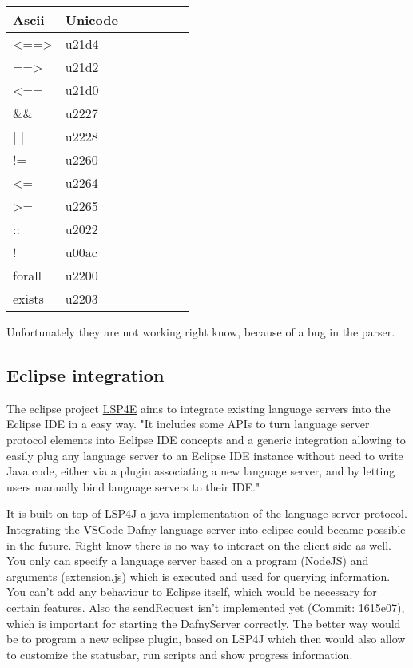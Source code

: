 \begin{longtable}[H]
	{l|p{}| p{} | p{} | p{} | p{} | p{}}
	
	\textbf{Ascii} & \textbf{Unicode}  \\ \hline
	<==> & u21d4  \\  
	==> & u21d2  \\  
	<== & u21d0  \\  
	\&\& & u2227  \\  
	| | & u2228  \\  
	!= & u2260  \\  
	<= & u2264  \\  
	>= & u2265  \\  
	:: & u2022  \\  
	! & u00ac  \\  
	forall & u2200  \\  
	exists & u2203  
	
	
\end{longtable}

Unfortunately they are not working right know, because of a bug in the parser.


\subsection{Eclipse integration}
The eclipse project \href{https://projects.eclipse.org/projects/technology.lsp4e}{LSP4E} aims to integrate existing language servers into the Eclipse IDE in a easy way. 
\newline
"It includes some APIs to turn language server protocol elements into Eclipse IDE concepts and a generic integration allowing to easily plug any language server to an Eclipse IDE instance without need to write Java code, either via a plugin associating a new language server, and by letting users manually bind language servers to their IDE." \cite{lsp4e}

It is built on top of \href{https://github.com/eclipse/lsp4j}{LSP4J} a java implementation of the language server protocol. 
\newline
Integrating the VSCode Dafny language server into eclipse could became possible in the future. Right know there is no way to interact on the client side as well. You only can specify a language server based on a program (NodeJS) and arguments (extension.js) which is executed and used for querying information. You can't add any behaviour to Eclipse itself, which would be necessary for certain features. Also the sendRequest isn't implemented yet (Commit: 1615e07), which is important for starting the DafnyServer correctly. 
The better way would be to program a new eclipse plugin, based on LSP4J which then would also allow to customize the statusbar, run scripts and show progress information. 




